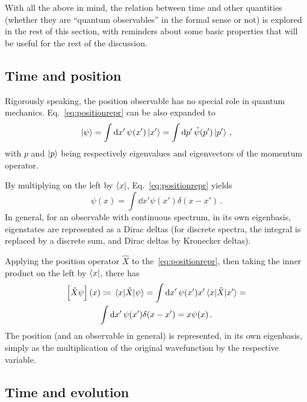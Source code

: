 With all the above in mind, the relation between time and other quantities
(whether they are ``quantum observables'' in the formal sense or not)
is explored in the rest of this section,
with reminders about some basic properties that will be useful for the rest of the
discussion.

\subsection{Time and position}

Rigorously speaking, the position observable has no special role in quantum mechanics.
Eq.~\eqref{eq:positionrepr} can be also expanded to
\begin{equation}\label{eq:qprepr}
  \ket{\psi} = \int \dd{x'} \psi(x') \ket{x'} = \int \dd{p'} \tilde{\psi}(p') \ket{p'} \,\text{,}
\end{equation}
with $p$ and $\ket{p}$ being respectively eigenvalues and eigenvectors of the momentum operator.

By multiplying on the left by $\bra{x}$, Eq.~\eqref{eq:positionrepr} yields
\begin{equation}\label{eq:diracdeltax}
  \psi(x) = \int \dd{x'} \psi(x') \delta(x-x') \,\text{.}
\end{equation}
In general, for an observable with continuous spectrum,
in its own eigenbasis, eigenstates are represented as a Dirac deltas
(for discrete spectra, the integral is replaced by a discrete sum,
and Dirac deltas by Kronecker deltas).

Applying the position operator $\hat{X}$ to the~\eqref{eq:positionrepr},
then taking the inner product on the left by $\bra{x}$,
there has
\begin{multline}
  \qty[\hat{X}\psi](x) \coloneqq \mel{x}{\hat{X}}{\psi} =
    \int \dd{x'} \psi(x') x' \mel{x}{\hat{X}}{x'} = \\
    \int \dd{x'} \psi(x') \delta(x-x') =
    x\psi(x)
  \,\text{.}
\end{multline}
The position
(and an observable in general) is represented, in its own eigenbasis,
simply as the multiplication of the original wavefunction by the respective variable.

\subsection{Time and evolution}

